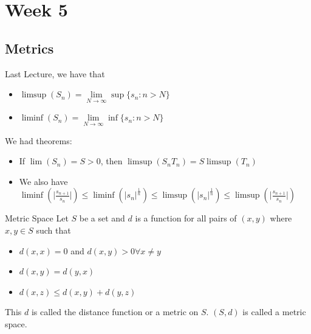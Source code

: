 \documentclass{report}
\begin{document}
\chapter{Week 5}

\begin{topic}
    \section{Metrics}
\end{topic}

Last Lecture, we have that
    \begin{itemize}
        \item $\limsup(S_{n}) = \lim\limits_{N \to \infty} \sup \{s_{n} : n > N\}$

        \item $\liminf(S_{n}) = \lim\limits_{N \to \infty} \inf \{s_{n} : n > N\}$ 
    \end{itemize}
We had theorems:
    \begin{itemize}
        \item If $\lim(S_{n}) = S > 0$, then $\limsup(S_{n}T_{n}) = S\limsup(T_{n})$

        \item We also have $\liminf(\lvert \frac{s_{n + 1}}{s_{n}} \rvert) \leq \liminf (\lvert s_{n} \rvert^{\frac{1}{n}}) \leq \limsup(\lvert s_{n} \rvert^{\frac{1}{n}}) \leq \limsup(\lvert \frac{s_{n + 1}}{s_{n}} \rvert)$ 
    \end{itemize}

\begin{definition}{Metric Space}
    Let $S$ be a set and $d$ is a function for all pairs of $(x, y)$ where $x, y \in S$ such that
        \begin{itemize}
            \item $d(x,x) = 0$ and $d(x, y) > 0 \forall x \neq y$

            \item $d(x, y) = d(y, x)$

            \item $d(x, z) \leq d(x, y) + d(y, z)$ 
        \end{itemize}
    This $d$ is called the distance function or a metric on $S$. $(S, d)$ is called a metric space.
\end{definition}
\end{document}
